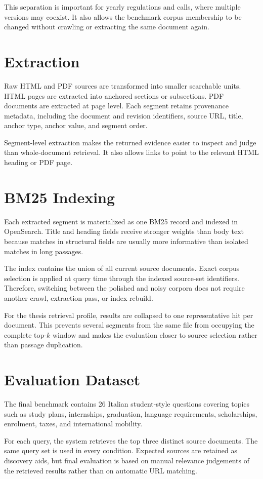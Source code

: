 This separation is important for yearly regulations and calls, where multiple versions may coexist. It also allows the benchmark corpus membership to be changed without crawling or extracting the same document again.

\section{Extraction}
Raw HTML and PDF sources are transformed into smaller searchable units. HTML pages are extracted into anchored sections or subsections. PDF documents are extracted at page level. Each segment retains provenance metadata, including the document and revision identifiers, source URL, title, anchor type, anchor value, and segment order.

Segment-level extraction makes the returned evidence easier to inspect and judge than whole-document retrieval. It also allows links to point to the relevant HTML heading or PDF page.

\section{BM25 Indexing}
Each extracted segment is materialized as one BM25 record and indexed in OpenSearch. Title and heading fields receive stronger weights than body text because matches in structural fields are usually more informative than isolated matches in long passages.

The index contains the union of all current source documents. Exact corpus selection is applied at query time through the indexed source-set identifiers. Therefore, switching between the polished and noisy corpora does not require another crawl, extraction pass, or index rebuild.

For the thesis retrieval profile, results are collapsed to one representative hit per document. This prevents several segments from the same file from occupying the complete top-$k$ window and makes the evaluation closer to source selection rather than passage duplication.

\section{Evaluation Dataset}
The final benchmark contains 26 Italian student-style questions covering topics such as study plans, internships, graduation, language requirements, scholarships, enrolment, taxes, and international mobility.

For each query, the system retrieves the top three distinct source documents. The same query set is used in every condition. Expected sources are retained as discovery aids, but final evaluation is based on manual relevance judgements of the retrieved results rather than on automatic URL matching.


